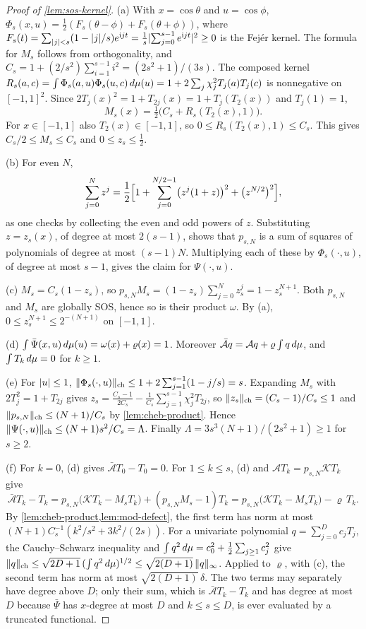 \begin{proof}[Proof of \cref{lem:sos-kernel}]
(a) With $x=\cos\theta$ and $u=\cos\phi$,
$\Phi_s(x,u)=\frac12(F_s(\theta-\phi)+F_s(\theta+\phi))$, where
$F_s(t)=\sum_{\lvert j\rvert<s}(1-\lvert j\rvert/s)e^{\mathrm{i}jt}
=\frac1s\lvert \sum_{j=0}^{s-1}e^{\mathrm{i}jt}\rvert^2\ge0$ is the Fejér kernel.
The formula for $M_s$ follows from orthogonality, and
$C_s=1+(2/s^2)\sum_{i=1}^{s-1}i^2=(2s^2+1)/(3s)$. The composed kernel
$R_s(a,c)=\int\Phi_s(a,u)\Phi_s(u,c)\,d\mu(u)=1+2\sum_j\chi_j^2T_j(a)T_j(c)$
is nonnegative on $[-1,1]^2$. Since $2T_j(x)^2=1+T_{2j}(x)=1+T_j(T_2(x))$
and $T_j(1)=1$,
\[
  M_s(x)=\tfrac12\bigl(C_s+R_s(T_2(x),1)\bigr).
\]
For $x\in[-1,1]$ also $T_2(x)\in[-1,1]$, so $0\le R_s(T_2(x),1)\le C_s$.
This gives $C_s/2\le M_s\le C_s$ and $0\le z_s\le\frac12$.

(b) For even $N$,
\begin{equation}\label{eq:mod-geometric}
  \sum_{j=0}^Nz^j=\frac12\Bigl[1+\sum_{j=0}^{N/2-1}\bigl(z^j(1+z)\bigr)^2
  +\bigl(z^{N/2}\bigr)^2\Bigr],
\end{equation}
as one checks by collecting the even and odd powers of $z$. Substituting
$z=z_s(x)$, of degree at most $2(s-1)$, shows that $p_{s,N}$ is a sum of
squares of polynomials of degree at most $(s-1)N$. Multiplying each of these
by $\Phi_s(\cdot,u)$, of degree at most $s-1$, gives the claim for
$\Psi(\cdot,u)$.

(c) $M_s=C_s(1-z_s)$, so $p_{s,N}M_s=(1-z_s)\sum_{j=0}^Nz_s^j=1-z_s^{N+1}$.
Both $p_{s,N}$ and $M_s$ are globally SOS, hence so is their product $\omega$.
By (a), $0\le z_s^{N+1}\le2^{-(N+1)}$ on $[-1,1]$.

(d) $\int\bar\Psi(x,u)\,d\mu(u)=\omega(x)+\varrho(x)=1$. Moreover
$\bar{\mathcal A}q=\mathcal Aq+\varrho\int q\,d\mu$, and
$\int T_k\,d\mu=0$ for $k\ge1$.

(e) For $\lvert u\rvert\le1$, $\lVert \Phi_s(\cdot,u)\rVert_{\mathrm{ch}}\le1+2\sum_{j=1}^{s-1}
(1-j/s)=s$. Expanding $M_s$ with $2T_j^2=1+T_{2j}$ gives
$z_s=\frac{C_s-1}{2C_s}-\frac1{C_s}\sum_{j=1}^{s-1}\chi_j^2T_{2j}$, so
$\lVert z_s\rVert_{\mathrm{ch}}=(C_s-1)/C_s\le1$ and $\lVert p_{s,N}\rVert_{\mathrm{ch}}\le(N+1)/C_s$ by
\cref{lem:cheb-product}. Hence $\lVert \Psi(\cdot,u)\rVert_{\mathrm{ch}}\le(N+1)s^2/C_s=
\Lambda$. Finally $\Lambda=3s^3(N+1)/(2s^2+1)\ge1$ for $s\ge2$.

(f) For $k=0$, (d) gives $\bar{\mathcal A}T_0-T_0=0$. For $1\le k\le s$,
(d) and $\mathcal AT_k=p_{s,N}\mathcal KT_k$ give
\[
  \bar{\mathcal A}T_k-T_k=p_{s,N}\bigl(\mathcal KT_k-M_sT_k\bigr)
  +(p_{s,N}M_s-1)T_k
  =p_{s,N}\bigl(\mathcal KT_k-M_sT_k\bigr)-\varrho\,T_k.
\]
By \cref{lem:cheb-product,lem:mod-defect}, the first term has norm at most
$(N+1)C_s^{-1}(k^2/s^2+3k^2/(2s))$. For a univariate polynomial
$q=\sum_{j=0}^Dc_jT_j$, the Cauchy--Schwarz inequality and
$\int q^2\,d\mu=c_0^2+\frac12\sum_{j\ge1}c_j^2$ give
$\lVert q\rVert_{\mathrm{ch}}\le\sqrt{2D+1}\,(\int q^2\,d\mu)^{1/2}\le\sqrt{2(D+1)}\,
\lVert q\rVert_\infty$. Applied to $\varrho$, with (c), the second term has norm at
most $\sqrt{2(D+1)}\,\delta$. The two terms may separately have degree above
$D$; only their sum, which is $\bar{\mathcal A}T_k-T_k$ and has degree at
most $D$ because $\bar\Psi$ has $x$-degree at most $D$ and $k\le s\le D$,
is ever evaluated by a truncated functional.
\end{proof}

